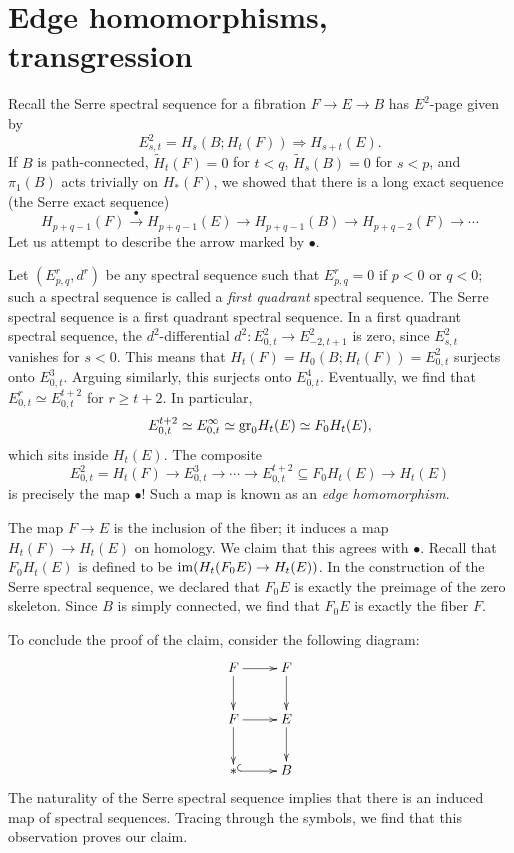 \section{Edge homomorphisms, transgression}
Recall the Serre spectral sequence for a fibration $F\to E\to B$ has $E^2$-page
given by
$$
E^2_{s,t} = H_s(B;H_t(F)) \Rightarrow H_{s+t}(E).
$$
If $B$ is path-connected, $\widetilde{H}_t(F) = 0$ for $t<q$,
$\widetilde{H}_s(B) = 0$ for $s<p$, and $\pi_1(B)$ acts trivially on
$H_\ast(F)$, we showed that there is a long exact sequence (the Serre exact
sequence)
\begin{equation}\label{serre-exact}
    H_{p+q-1}(F)\xrightarrow{\bullet} H_{p+q-1}(E)\to H_{p+q-1}(B)\to
    H_{p+q-2}(F)\to\cdots
\end{equation}
Let us attempt to describe the arrow marked by $\bullet$. %

Let $(E^r_{p,q},d^r)$ be any spectral sequence such that $E^r_{p,q} = 0$ if
$p<0$ or $q<0$; such a spectral sequence is called a \emph{first quadrant}
spectral sequence. The Serre spectral sequence is a first quadrant spectral
sequence. In a first quadrant spectral sequence, the $d^2$-differential
$d^2:E^2_{0,t}\to E^2_{-2,t+1}$ is zero, since $E^2_{s,t}$ vanishes for $s<0$.
This means that $H_t(F) = H_0(B;H_t(F)) = E^2_{0,t}$ surjects onto $E^3_{0,t}$.
Arguing similarly, this surjects onto $E^4_{0,t}$. Eventually, we find that
$E^{r}_{0,t} \simeq E^{t+2}_{0,t}$ for $r\geq t+2$.
In particular,
$$E^{t+2}_{0,t} \simeq E^\infty_{0,t} \simeq \mathrm{gr}_0 H_t(E) \simeq F_0 H_t(E),$$
which sits inside $H_t(E)$. The composite
$$E^2_{0,t} = H_t(F) \to E^3_{0,t}\to \cdots\to E^{t+2}_{0,t} \subseteq F_0
H_t(E)\to H_t(E)$$
is precisely the map $\bullet$! Such a map is known as an \emph{edge
homomorphism}.

The map $F\to E$ is the inclusion of the fiber; it induces a map $H_t(F)\to
H_t(E)$ on homology. We claim that this agrees with $\bullet$.
Recall that $F_0H_t(E)$ is defined to be $\operatorname{im}(H_t(F_0 E) \to H_t(E))$. In the
construction of the Serre spectral sequence, we declared that $F_0 E$ is
exactly the preimage of the zero skeleton. Since $B$ is simply connected, we
find that $F_0 E$ is exactly the fiber $F$.

To conclude the proof of the claim, consider the following diagram:
\begin{equation*}
    \xymatrix{
	F\ar[r]\ar[d] & F\ar[d]\\
	F\ar[r]\ar[d] & E\ar[d]\\
	\ast\ar@{^(->}[r] & B
    }
\end{equation*}
The naturality of the Serre spectral sequence implies that there is an induced
map of spectral sequences. Tracing through the symbols, we find that this
observation proves our claim.

